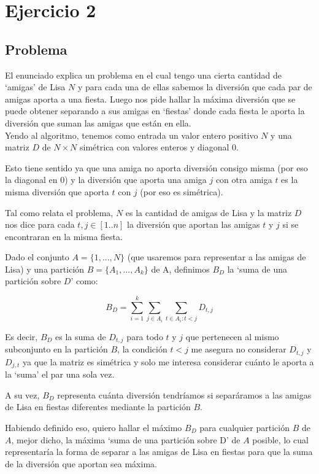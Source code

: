 \section{Ejercicio 2}

\subsection{Problema}
El enunciado explica un problema en el cual tengo una cierta cantidad de
`amigas' de Lisa $N$ y para cada una de ellas sabemos la diversión que cada par
de amigas aporta a una fiesta. Luego nos pide hallar la máxima diversión que se
puede obtener separando a sus amigas en `fiestas' donde cada fiesta le aporta la
diversión que suman las amigas que están en ella. \\ Yendo al algoritmo, tenemos
como entrada un valor entero positivo $N$ y una
matriz $D$ de $N \times N$ simétrica con valores enteros y diagonal 0.

Esto tiene sentido ya que una amiga no aporta diversión consigo misma (por eso
la diagonal en 0) y la diversión que aporta una amiga $j$ con otra amiga $t$ es
la misma diversión que aporta $t$ con $j$ (por eso es simétrica).

Tal como relata el problema, $N$ es la cantidad de amigas de Lisa y la matriz
$D$ nos dice para cada $t,j \in [1..n]$ la diversión que aportan las amigas $t$
y $j$ si se encontraran en la misma fiesta.

Dado el conjunto $A = \{1,...,N\}$ (que usaremos para representar a las amigas
de Lisa) y una partición $B = \{A_1,...,A_k\}$ de A, definimos $B_D$ la `suma de
una partición sobre $D$' como:

\begin{equation*}
    B_D = \sum_{i=1}^{k}{\sum_{j \in A_i}^{}{\sum_{t \in A_i : t < j}^{}{D_{t,j}}}}
\end{equation*}

Es decir, $B_D$ es la suma de $D_{t,j}$ para todo $t$ y $j$ que pertenecen al
mismo subconjunto en la partición $B$, la condición $t < j$ me asegura no
considerar $D_{t,j}$ y $D_{j,t}$ ya que la matriz es simétrica y solo me
interesa considerar cuánto le aporta a la `suma' el par una sola vez.

A su vez, $B_D$ representa cuánta diversión tendríamos si separáramos a las
amigas de Lisa en fiestas diferentes mediante la partición $B$.

Habiendo definido eso, quiero hallar el máximo $B_D$ para cualquier partición
$B$ de $A$, mejor dicho, la máxima `suma de una partición sobre D' de $A$
posible, lo cual representaría la forma de separar a las amigas de Lisa en
fiestas para que la suma de la diversión que aportan sea máxima.

